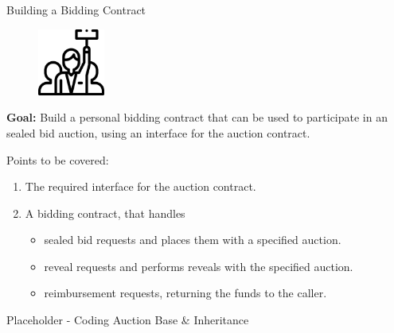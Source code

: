 \documentclass[]{beamer}
\begin{document}
\begin{frame}{Building a Bidding Contract}

\begin{minipage}{0.3\textwidth}
	\begin{figure}
		\center
		\includegraphics[width= 2.2cm]{../assets/images/bidder.png}	
	\end{figure}
\end{minipage}
\begin{minipage}{0.65\textwidth}
	\vspace{0.5em}
	\textbf{Goal:} Build a personal bidding contract that can be used to participate in an sealed bid auction, using an interface for the auction contract.\\
\end{minipage}

\vspace{2em}

Points to be covered:
\vspace{0.5em}
\begin{enumerate}
	\item	The required interface for the auction contract.
	\item	A bidding contract, that handles
	\vspace{0.5em}
	\begin{itemize}
		\item sealed bid requests and places them with a specified auction.
		\item reveal requests and performs reveals with the specified auction.
		\item reimbursement requests, returning the funds to the caller.
	\end{itemize}
\end{enumerate}


\end{frame}


\begin{frame}{Placeholder - Coding Auction Base \& Inheritance}

\end{frame}
\end{document}
